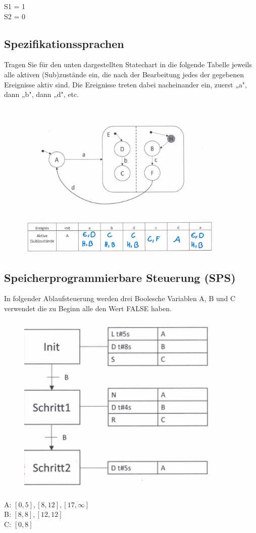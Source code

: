 S1 = 1\\
S2 = 0

\subsection{Spezifikationssprachen}
Tragen Sie für den unten dargestellten Statechart in die folgende Tabelle jeweils alle aktiven (Sub)zustände ein, 
die nach der Bearbeitung jedes der gegebenen Ereignisse aktiv sind. Die Ereignisse treten dabei nacheinander ein, 
zuerst „a", dann „b", dann „d", etc. 

\begin{figure}[H]
  \includegraphics[width=10cm]{images/KA171121/5angabe.png}
  \centering
\end{figure}

\begin{figure}[H]
  \includegraphics[width=10cm]{images/KA171121/5a.png}
  \centering
\end{figure}

\subsection{Speicherprogrammierbare Steuerung (SPS)}
In folgender Ablaufsteuerung werden drei Boolesche Variablen A, B und C verwendet die zu Beginn alle den Wert FALSE haben.

\begin{figure}[H]
  \includegraphics[width=10cm]{images/KA171121/6angabe.png}
  \centering
\end{figure}

A: $[0,5], [8,12], [17,\infty]$\\
B: $[8,8], [12,12]$\\
C: $[0,8]$